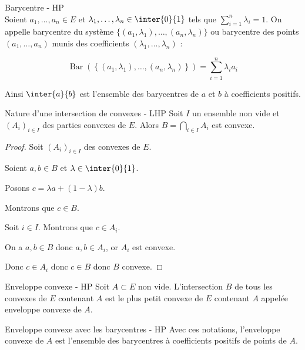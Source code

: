 \begin{definition}{Barycentre - HP}{}
    \\Soient $a_1, \dots, a_n \in E$ et $\lambda_1, \dots, \lambda_n \in \inter{0}{1}$
    tels que $\sum_{i = 1}^n \lambda_i = 1$.
    On appelle barycentre du système $\{(a_1, \lambda_1), \dots, (a_n, \lambda_n)\}$
    ou barycentre des points $(a_1, \dots, a_n)$ munis des coefficients $(\lambda_1, \dots, \lambda_n)$ :

    $$\operatorname{Bar}(\left\{(a_1, \lambda_1), \dots, (a_n, \lambda_n)\right\}) = \sum_{i = 1}^n \lambda_i a_i$$

    Ainsi $\inter{a}{b}$ est l'ensemble des barycentres de $a$ et $b$ à coefficients positifs. 
\end{definition}

\begin{proposition}{Nature d'une intersection de convexes - LHP}{}
    Soit $I$ un ensemble non vide et $(A_i)_{i \in I}$ des parties convexes de $E$. 
    Alors $\displaystyle B = \bigcap_{i \in I} A_i$ est convexe.
\end{proposition}


\begin{proof}
    Soit $(A_i)_{i \in I}$ des convexes de $E$. 

    Soient $a, b \in B$ et $\lambda \in \inter{0}{1}$. 

    Posons $c = \lambda a + (1 - \lambda)b$. 

    Montrons que $c \in B$. 

    Soit $i \in I$. Montrons que $c \in A_i$. 

    On a $a, b \in B$ donc $a, b \in A_i$, or $A_i$ est convexe. 

    Donc $c \in A_i$ donc $c \in B$ donc $B$ convexe. 
\end{proof}

\begin{definition}{Enveloppe convexe - HP}{}
    Soit $A \subset E$ non vide. L'intersection $B$ de tous les convexes de $E$ contenant $A$ est le plus petit convexe
    de $E$ contenant $A$ appelée enveloppe convexe de $A$.
\end{definition}

\begin{theoreme}{Enveloppe convexe avec les barycentres - HP}{}
    Avec ces notations, l'enveloppe convexe de $A$ est l'ensemble des barycentres à
    coefficients positifs de points de $A$. 
\end{theoreme}

